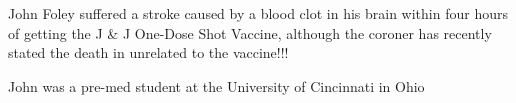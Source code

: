 John Foley suffered a stroke caused by a blood clot in his brain within four
hours of getting the J \& J One-Dose Shot Vaccine, although the coroner has
recently stated the death in unrelated to the vaccine!!!

John was a pre-med student at the University of Cincinnati in Ohio

